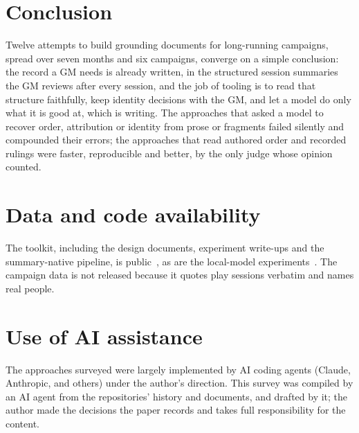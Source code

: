 \documentclass[11pt]{article}
\begin{document}
\section{Conclusion}
Twelve attempts to build grounding documents for long-running campaigns, spread over seven months and
six campaigns, converge on a simple conclusion: the record a GM needs is already written, in the
structured session summaries the GM reviews after every session, and the job of tooling is to
read that structure faithfully, keep identity decisions with the GM, and let a model do only what it is
good at, which is writing. The approaches that asked a model to recover order, attribution or identity
from prose or fragments failed silently and compounded their errors; the approaches that read authored
order and recorded rulings were faster, reproducible and better, by the only judge whose opinion
counted.

\section*{Data and code availability}
The toolkit, including the design documents, experiment write-ups and the summary-native pipeline,
is public~\cite{campaigngen}, as are the local-model experiments~\cite{dgxfun}. The campaign data is
not released because it quotes play sessions verbatim and names real people.

\section*{Use of AI assistance}
The approaches surveyed were largely implemented by AI coding agents (Claude, Anthropic, and others)
under the author's direction. This survey was compiled by an AI agent from the repositories' history and
documents, and drafted by it; the author made the decisions the paper records and takes full
responsibility for the content.
\end{document}
